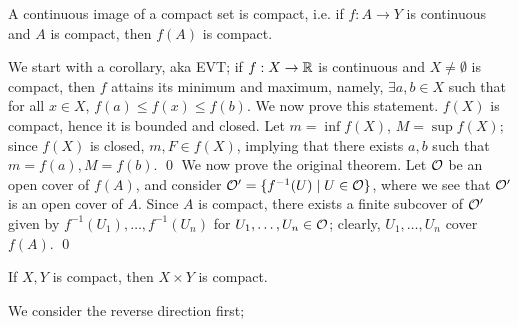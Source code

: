 \begin{simplethm}
    A continuous image of a compact set is compact, i.e. if $f : A \to Y$ is continuous and $A$ is compact, then $f(A)$ is compact.
\end{simplethm}
\noindent We start with a corollary, aka EVT; if $f : X \to \mathbb R$ is continuous and $X \neq \emptyset$ is compact, then $f$ attains its minimum and maximum, namely, $\exists a, b \in X$ such that for all $x \in X$, $f(a) \leq f(x) \leq f(b)$. We now prove this statement.
\medskip\newline
$f(X)$ is compact, hence it is bounded and closed. Let $m = \inf f(X)$, $M = \sup f(X)$; since $f(X)$ is closed, $m, F \in f(X)$, implying that there exists $a, b$ such that $m = f(a), M = f(b)$. \qed
\medskip\newline
We now prove the original theorem. Let $\mathcal O$ be an open cover of $f(A)$, and consider $\mathcal O' = \{f^{-1}(U) \mid U \in \mathcal O\}$, where we see that $\mathcal O'$ is an open cover of $A$. Since $A$ is compact, there exists a finite subcover of $\mathcal O'$ given by $f^{-1}(U_1), \dots, f^{-1}(U_n)$ for $U_1, \dots, U_n \in \mathcal O$; clearly, $U_1, \dots, U_n$ cover $f(A)$. \qed
\begin{simplethm}
    If $X, Y$ is compact, then $X \times Y$ is compact.
\end{simplethm}
\noindent We consider the reverse direction first;
